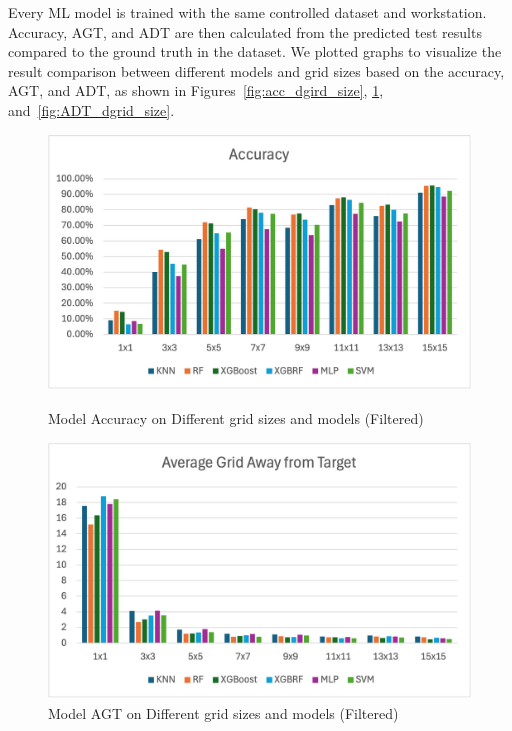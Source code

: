 \documentclass[runningheads]{llncs}
\begin{document}
Every ML model is trained with the same controlled dataset and workstation. Accuracy, AGT, and ADT are then calculated from the predicted test results compared to the ground truth in the dataset. We plotted graphs to visualize the result comparison between different models and grid sizes based on the accuracy, AGT, and ADT, as shown in Figures~\ref{fig:acc_dgird_size}, \ref{fig:AGT_dgrid_size}, and~\ref{fig:ADT_dgrid_size}.

\begin{figure}[thb!]
	\begin{minipage}{0.45\linewidth}
		\centering
		\includegraphics[width=\linewidth]{figures/overview_filtered_accuracy.png}
		\caption{Model Accuracy on Different grid sizes and models (Filtered)}
		\label{fig:acc_dgird_size}
	\end{minipage}
	\hfill
	\begin{minipage}{0.45\linewidth}
		\centering
		\includegraphics[width=\linewidth]{figures/overview_filtered_agt.png}
		\caption{Model AGT on Different grid sizes and models (Filtered)}
		\label{fig:AGT_dgrid_size}
	\end{minipage}
\end{figure}
\end{document}

